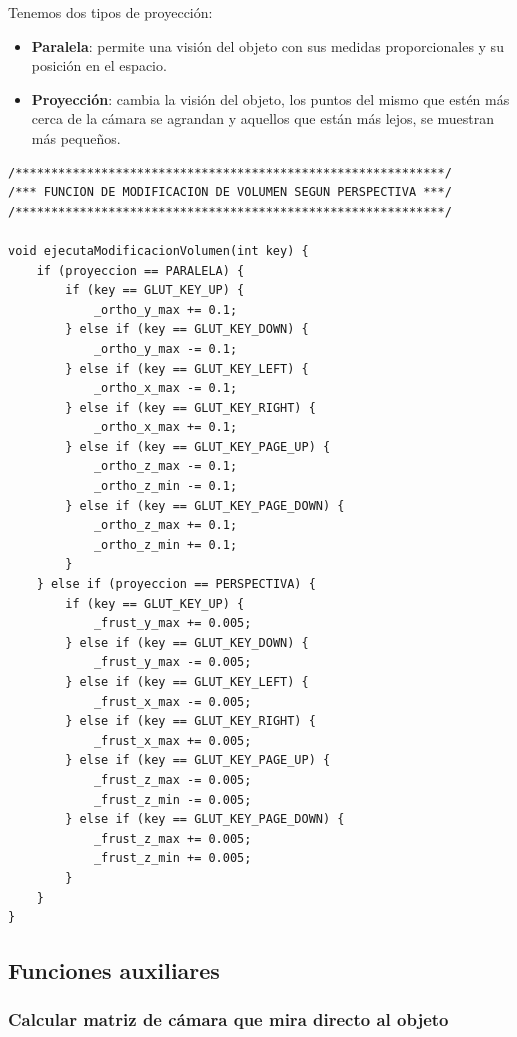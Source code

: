 \documentclass[12pt,a4paper]{article}
\begin{document}
Tenemos dos tipos de proyección:

\begin{itemize}
\item \textbf{Paralela}: permite una visión del objeto con sus medidas proporcionales y su posición en el espacio.
\item \textbf{Proyección}: cambia la visión del objeto, los puntos del mismo que estén más cerca de la cámara se agrandan y aquellos que están más lejos, se muestran más pequeños.
\end{itemize}

\begin{lstlisting}
/************************************************************/
/*** FUNCION DE MODIFICACION DE VOLUMEN SEGUN PERSPECTIVA ***/
/************************************************************/

void ejecutaModificacionVolumen(int key) {
    if (proyeccion == PARALELA) {
        if (key == GLUT_KEY_UP) {
            _ortho_y_max += 0.1;
        } else if (key == GLUT_KEY_DOWN) {
            _ortho_y_max -= 0.1;
        } else if (key == GLUT_KEY_LEFT) {
            _ortho_x_max -= 0.1;
        } else if (key == GLUT_KEY_RIGHT) {
            _ortho_x_max += 0.1;
        } else if (key == GLUT_KEY_PAGE_UP) {
            _ortho_z_max -= 0.1;
            _ortho_z_min -= 0.1;
        } else if (key == GLUT_KEY_PAGE_DOWN) {
            _ortho_z_max += 0.1;
            _ortho_z_min += 0.1;
        }
    } else if (proyeccion == PERSPECTIVA) {
        if (key == GLUT_KEY_UP) {
            _frust_y_max += 0.005;
        } else if (key == GLUT_KEY_DOWN) {
            _frust_y_max -= 0.005;
        } else if (key == GLUT_KEY_LEFT) {
            _frust_x_max -= 0.005;
        } else if (key == GLUT_KEY_RIGHT) {
            _frust_x_max += 0.005;
        } else if (key == GLUT_KEY_PAGE_UP) {
            _frust_z_max -= 0.005;
            _frust_z_min -= 0.005;
        } else if (key == GLUT_KEY_PAGE_DOWN) {
            _frust_z_max += 0.005;
            _frust_z_min += 0.005;
        }
    }
}
\end{lstlisting}

\newpage
\subsection{Funciones auxiliares}

\subsubsection{Calcular matriz de cámara que mira directo al objeto}
\end{document}
